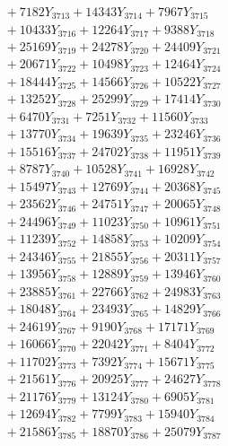 \documentclass[a4paper,10pt]{article}
\begin{document}
{\begin{align}
&\;  + 7182 Y_{3713} + 14343 Y_{3714} + 7967 Y_{3715} \\[0.3ex]
&\;  + 10433 Y_{3716} + 12264 Y_{3717} + 9388 Y_{3718} \\[0.5ex]\allowbreak
&\;  + 25169 Y_{3719} + 24278 Y_{3720} + 24409 Y_{3721} \\[0.3ex]
&\;  + 20671 Y_{3722} + 10498 Y_{3723} + 12464 Y_{3724} \\[0.3ex]
&\;  + 18444 Y_{3725} + 14566 Y_{3726} + 10522 Y_{3727} \\[0.3ex]
&\;  + 13252 Y_{3728} + 25299 Y_{3729} + 17414 Y_{3730} \\[0.3ex]
&\;  + 6470 Y_{3731} + 7251 Y_{3732} + 11560 Y_{3733} \\[0.3ex]
&\;  + 13770 Y_{3734} + 19639 Y_{3735} + 23246 Y_{3736} \\[0.3ex]
&\;  + 15516 Y_{3737} + 24702 Y_{3738} + 11951 Y_{3739} \\[0.3ex]
&\;  + 8787 Y_{3740} + 10528 Y_{3741} + 16928 Y_{3742} \\[0.3ex]
&\;  + 15497 Y_{3743} + 12769 Y_{3744} + 20368 Y_{3745} \\[0.3ex]
&\;  + 23562 Y_{3746} + 24751 Y_{3747} + 20065 Y_{3748} \\[0.5ex]\allowbreak
&\;  + 24496 Y_{3749} + 11023 Y_{3750} + 10961 Y_{3751} \\[0.3ex]
&\;  + 11239 Y_{3752} + 14858 Y_{3753} + 10209 Y_{3754} \\[0.3ex]
&\;  + 24346 Y_{3755} + 21855 Y_{3756} + 20311 Y_{3757} \\[0.3ex]
&\;  + 13956 Y_{3758} + 12889 Y_{3759} + 13946 Y_{3760} \\[0.3ex]
&\;  + 23885 Y_{3761} + 22766 Y_{3762} + 24983 Y_{3763} \\[0.3ex]
&\;  + 18048 Y_{3764} + 23493 Y_{3765} + 14829 Y_{3766} \\[0.3ex]
&\;  + 24619 Y_{3767} + 9190 Y_{3768} + 17171 Y_{3769} \\[0.3ex]
&\;  + 16066 Y_{3770} + 22042 Y_{3771} + 8404 Y_{3772} \\[0.3ex]
&\;  + 11702 Y_{3773} + 7392 Y_{3774} + 15671 Y_{3775} \\[0.3ex]
&\;  + 21561 Y_{3776} + 20925 Y_{3777} + 24627 Y_{3778} \\[0.5ex]\allowbreak
&\;  + 21176 Y_{3779} + 13124 Y_{3780} + 6905 Y_{3781} \\[0.3ex]
&\;  + 12694 Y_{3782} + 7799 Y_{3783} + 15940 Y_{3784} \\[0.3ex]
&\;  + 21586 Y_{3785} + 18870 Y_{3786} + 25079 Y_{3787} \\[0.3ex]

\end{align}}
\end{document}
